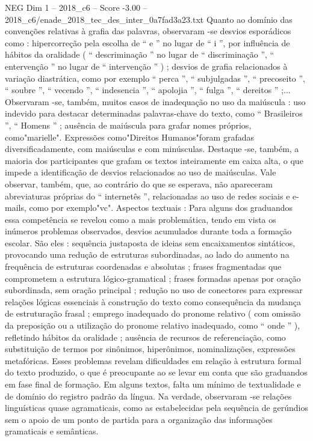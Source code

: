 \begin{textsample}{NEG Dim 1 – 2018\_c6 – Score -3.00 – 2018\_c6/enade\_2018\_tec\_des\_inter\_0a7fad3a23.txt}
Quanto ao domínio das convenções relativas à grafia das palavras, observaram -se desvios esporádicos como : hipercorreção pela escolha de “ e ” no lugar de “ i ”, por influência de hábitos da oralidade ( “ descriminação ” no lugar de “ discriminação ”, “ entervenção ” no lugar de “ intervenção ” ) ; desvios de grafia relacionados à variação diastrática, como por exemplo “ perca ”, “ subjulgadas ”, “ precoseito ”, “ soubre ”, “ vecendo ”, “ indesencia ”, “ apolojia ”, “ fulga ”, “ dereitos ” ;...
Observaram -se, também, muitos casos de inadequação no uso da maiúscula : uso indevido para destacar determinadas palavras-chave do texto, como “ Brasileiros ”, “ Homens ” ; ausência de maiúscula para grafar nomes próprios, como"marielle".
Expressões como"Direitos Humanos"foram grafadas diversificadamente, com maiúsculas e com minúsculas.
Destaque -se, também, a maioria dos participantes que grafam os textos inteiramente em caixa alta, o que impede a identificação de desvios relacionados ao uso de maiúsculas.
Vale observar, também, que, ao contrário do que se esperava, não apareceram abreviaturas próprias do “ internetês ”, relacionadas ao uso de redes sociais e e-mails, como por exemplo"vc".
Aspectos textuais : Para alguns dos graduandos essa competência se revelou como a mais problemática, tendo em vista os inúmeros problemas observados, desvios acumulados durante toda a formação escolar.
São eles : sequência justaposta de ideias sem encaixamentos sintáticos, provocando uma redução de estruturas subordinadas, ao lado do aumento na frequência de estruturas coordenadas e absolutas ; frases fragmentadas que comprometem a estrutura lógico-gramatical ; frases formadas apenas por oração subordinada, sem oração principal ; redução no uso de conectores para expressar relações lógicas essenciais à construção do texto como consequência da mudança de estruturação frasal ; emprego inadequado do pronome relativo ( com omissão da preposição ou a utilização do pronome relativo inadequado, como “ onde ” ), refletindo hábitos da oralidade ; ausência de recursos de referenciação, como substituição de termos por sinônimos, hiperônimos, nominalizações, expressões metafóricas.
Esses problemas revelam dificuldades em relação à estrutura formal do texto produzido, o que é preocupante ao se levar em conta que são graduandos em fase final de formação.
Em alguns textos, falta um mínimo de textualidade e de domínio do registro padrão da língua.
Na verdade, observaram -se relações linguísticas quase agramaticais, como as estabelecidas pela sequência de gerúndios sem o apoio de um ponto de partida para a organização das informações gramaticais e semânticas.

\end{textsample}
